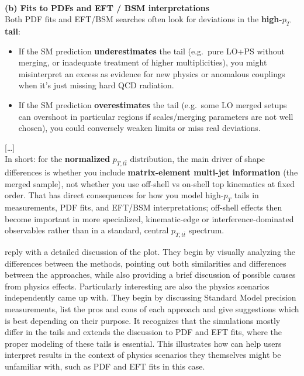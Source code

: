 \documentclass[submission, Phys]{SciPost}
\begin{document}
\begin{promptblock}\\
\textbf{(b) Fits to PDFs and EFT / BSM interpretations}\\
Both PDF fits and EFT/BSM searches often look for deviations in the \textbf{high-$p_T$ tail}:

\begin{itemize}
  \item If the SM prediction \textbf{underestimates} the tail (e.g.\ pure LO+PS without merging, or inadequate treatment of higher multiplicities), you might misinterpret an excess as evidence for new physics or anomalous couplings when it’s just missing hard QCD radiation.
  \item If the SM prediction \textbf{overestimates} the tail (e.g.\ some LO merged setups can overshoot in particular regions if scales/merging parameters are not well chosen), you could conversely weaken limits or miss real deviations.
\end{itemize}

[\ldots]\\
In short: for the \textbf{normalized} $p_{T,t\bar t}$ distribution, the main driver of shape differences is whether you include \textbf{matrix-element multi-jet information} (the merged sample), not whether you use off-shell vs on-shell top kinematics at fixed order. That has direct consequences for how you model high-$p_T$ tails in measurements, PDF fits, and EFT/BSM interpretations; off-shell effects then become important in more specialized, kinematic-edge or interference-dominated observables rather than in a standard, central $p_{T,t\bar t}$ spectrum.
\end{promptblock}
%
\ma reply with a detailed discussion of the plot. They begin by visually analyzing the differences between the methods, pointing out both similarities and differences between the approaches, while also providing a brief discussion of possible causes from physics effects.
Particularly interesting are also the physics scenarios \ma independently came up with. They begin by discussing Standard Model precision measurements, list the pros and cons of each approach and give suggestions which is best depending on their purpose. 
It recognizes that the simulations mostly differ in the tails and extends the discussion to PDF and EFT fits, where the proper modeling of these tails is essential. This illustrates how \ma can help users interpret results in the context of physics scenarios they themselves might be unfamiliar with, such as PDF and EFT fits in this case.
\clearpage
\end{document}
